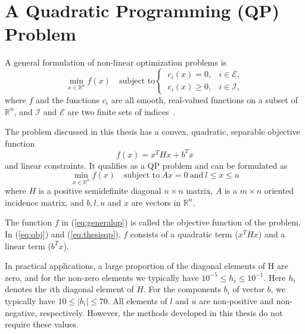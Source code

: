 \chapter{A Quadratic Programming (QP) Problem}
\label{ch:problem}
A general formulation of non-linear optimization problems is
\begin{equation}
    \label{eq:generalqp}
    \min_{x \in \mathbb{R}^n} f(x) \quad \textrm{subject to}
    \begin{cases}
        ~c_i(x) = 0,   & i \in \mathcal{E}, \\
        ~c_i(x) \ge 0, & i \in \mathcal{I},
    \end{cases}
\end{equation}
where $f$ and the functions $c_i$ are all smooth, real-valued functions on a
subset of $\mathbb{R}^n$, and $\mathcal{I}$ and $\mathcal{E}$ are two finite
sets of indices~\cite{nocedal}.

The problem discussed in this thesis has a convex, quadratic, separable
objective function
\begin{equation}
    \label{eq:obj}
    f(x) = x^T H x + b^T x
\end{equation}
and linear constraints. It qualifies as a QP problem and can be formulated as
\begin{equation}
    \label{eq:thesisqp}
    \min_{x \in \mathbb{R}^n} f(x)
    \quad \textrm{subject to}
    ~
    Ax = 0
    ~
    \textrm{and}
    ~
    l \le x \le u
\end{equation}
where $H$ is a positive semidefinite diagonal $n \times n$ matrix, $A$ is a
$m \times n$ oriented incidence matrix, and $b, l, u$ and $x$ are vectors in
$\mathbb{R}^n$.

The function $f$ in (\ref{eq:generalqp}) is called the objective function of
the problem. In (\ref{eq:obj}) and (\ref{eq:thesisqp}), $f$ consists of a
quadratic term ($x^T H x$) and a linear term ($b^T x$).

In practical applications, a large proportion of the diagonal elements of H are
zero, and for the non-zero elements we typically have
$10^{-5} \le h_i \le 10^{-1}$. Here $h_i$ denotes the $i$th diagonal element of
$H$. For the components $b_i$ of vector $b$, we typically have
$10 \le |b_i| \le 70$. All elements of $l$ and $u$ are non-positive 
and non-negative, respectively. However, the methods developed in this thesis
do not require these values.
